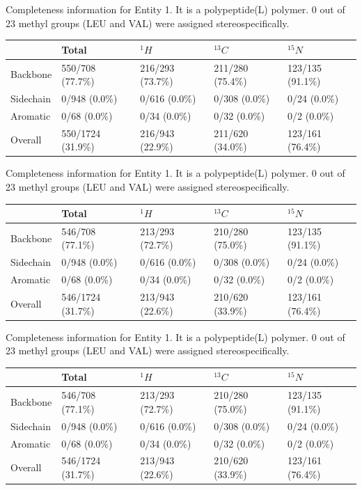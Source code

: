 Completeness information for Entity 1. It is a polypeptide(L) polymer. 0 out of 23 methyl groups (LEU and VAL) were assigned stereospecifically.\begin{longtable}{|l|l|l|l|l|}
\hline
  & Total & $^{1}H$ & $^{13}C$ & $^{15}N$\\\hline
Backbone & 550/708 (77.7\%)& 216/293 (73.7\%)& 211/280 (75.4\%)& 123/135 (91.1\%) \\
\hline
Sidechain & 0/948 (0.0\%)& 0/616 (0.0\%)& 0/308 (0.0\%)& 0/24 (0.0\%) \\
\hline
Aromatic & 0/68 (0.0\%)& 0/34 (0.0\%)& 0/32 (0.0\%)& 0/2 (0.0\%) \\
\hline
Overall & 550/1724 (31.9\%)& 216/943 (22.9\%)& 211/620 (34.0\%)& 123/161 (76.4\%) \\
\hline
\end{longtable}
Completeness information for Entity 1. It is a polypeptide(L) polymer. 0 out of 23 methyl groups (LEU and VAL) were assigned stereospecifically.\begin{longtable}{|l|l|l|l|l|}
\hline
  & Total & $^{1}H$ & $^{13}C$ & $^{15}N$\\\hline
Backbone & 546/708 (77.1\%)& 213/293 (72.7\%)& 210/280 (75.0\%)& 123/135 (91.1\%) \\
\hline
Sidechain & 0/948 (0.0\%)& 0/616 (0.0\%)& 0/308 (0.0\%)& 0/24 (0.0\%) \\
\hline
Aromatic & 0/68 (0.0\%)& 0/34 (0.0\%)& 0/32 (0.0\%)& 0/2 (0.0\%) \\
\hline
Overall & 546/1724 (31.7\%)& 213/943 (22.6\%)& 210/620 (33.9\%)& 123/161 (76.4\%) \\
\hline
\end{longtable}
Completeness information for Entity 1. It is a polypeptide(L) polymer. 0 out of 23 methyl groups (LEU and VAL) were assigned stereospecifically.\begin{longtable}{|l|l|l|l|l|}
\hline
  & Total & $^{1}H$ & $^{13}C$ & $^{15}N$\\\hline
Backbone & 546/708 (77.1\%)& 213/293 (72.7\%)& 210/280 (75.0\%)& 123/135 (91.1\%) \\
\hline
Sidechain & 0/948 (0.0\%)& 0/616 (0.0\%)& 0/308 (0.0\%)& 0/24 (0.0\%) \\
\hline
Aromatic & 0/68 (0.0\%)& 0/34 (0.0\%)& 0/32 (0.0\%)& 0/2 (0.0\%) \\
\hline
Overall & 546/1724 (31.7\%)& 213/943 (22.6\%)& 210/620 (33.9\%)& 123/161 (76.4\%) \\
\hline
\end{longtable}

